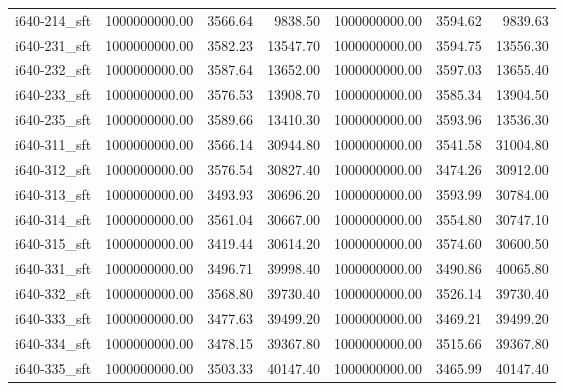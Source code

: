 \begin{tabular}{lrrrrrr}
i640-214\_sft &      1000000000.00 &                3566.64 &          9838.50 &         1000000000.00 &                   3594.62 &             9839.63 \\
i640-231\_sft &      1000000000.00 &                3582.23 &         13547.70 &         1000000000.00 &                   3594.75 &            13556.30 \\
i640-232\_sft &      1000000000.00 &                3587.64 &         13652.00 &         1000000000.00 &                   3597.03 &            13655.40 \\
i640-233\_sft &      1000000000.00 &                3576.53 &         13908.70 &         1000000000.00 &                   3585.34 &            13904.50 \\
i640-235\_sft &      1000000000.00 &                3589.66 &         13410.30 &         1000000000.00 &                   3593.96 &            13536.30 \\
i640-311\_sft &      1000000000.00 &                3566.14 &         30944.80 &         1000000000.00 &                   3541.58 &            31004.80 \\
i640-312\_sft &      1000000000.00 &                3576.54 &         30827.40 &         1000000000.00 &                   3474.26 &            30912.00 \\
i640-313\_sft &      1000000000.00 &                3493.93 &         30696.20 &         1000000000.00 &                   3593.99 &            30784.00 \\
i640-314\_sft &      1000000000.00 &                3561.04 &         30667.00 &         1000000000.00 &                   3554.80 &            30747.10 \\
i640-315\_sft &      1000000000.00 &                3419.44 &         30614.20 &         1000000000.00 &                   3574.60 &            30600.50 \\
i640-331\_sft &      1000000000.00 &                3496.71 &         39998.40 &         1000000000.00 &                   3490.86 &            40065.80 \\
i640-332\_sft &      1000000000.00 &                3568.80 &         39730.40 &         1000000000.00 &                   3526.14 &            39730.40 \\
i640-333\_sft &      1000000000.00 &                3477.63 &         39499.20 &         1000000000.00 &                   3469.21 &            39499.20 \\
i640-334\_sft &      1000000000.00 &                3478.15 &         39367.80 &         1000000000.00 &                   3515.66 &            39367.80 \\
i640-335\_sft &      1000000000.00 &                3503.33 &         40147.40 &         1000000000.00 &                   3465.99 &            40147.40 \\
\bottomrule
\end{tabular}

